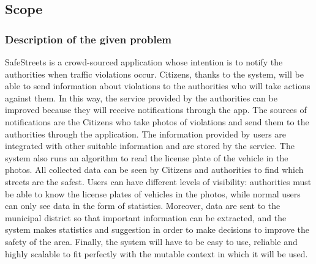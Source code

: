 \subsection{Scope}
\subsubsection{Description of the given problem}
SafeStreets is a crowd-sourced application whose intention is to notify the authorities when traffic
violations occur. Citizens, thanks to the system, will be able to send information about violations to the
authorities who will take actions against them. In this way, the service provided by the authorities can be
improved because they will receive notifications through the app. The sources of notifications are the
Citizens who take photos of violations and send them to the authorities through
the application. The information provided by users are integrated with other suitable information and are
stored by the service. The system also runs an algorithm to read the license plate of the vehicle in the
photos. All collected data can be seen by Citizens and authorities to find which streets are the safest.
Users can have different levels of visibility: authorities must be able to know the license plates of vehicles
in the photos, while normal users can only see data in the form of statistics. Moreover, data are sent to the municipal district so that important information can be extracted, and the system makes statistics and suggestion in order to make decisions to improve the safety of the area. Finally, the system will have to be easy to use, reliable
and highly scalable to fit perfectly with the mutable context in which it will be used.

